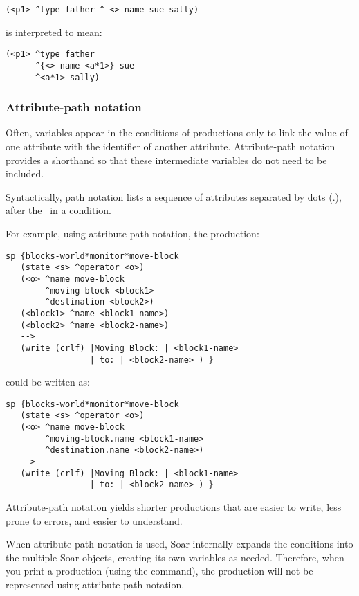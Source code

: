 \begin{verbatim}
(<p1> ^type father ^ <> name sue sally)
\end{verbatim}

is interpreted to mean:

\begin{verbatim}
(<p1> ^type father 
      ^{<> name <a*1>} sue 
      ^<a*1> sally)
\end{verbatim}


\subsubsection{Attribute-path notation}
\label{SYNTAX-pm-lhs-path}

Often, variables appear in the conditions of productions only to link the value of one attribute with the identifier of another attribute. Attribute-path notation provides a shorthand so that these intermediate variables do not need to be included.

Syntactically, path notation lists a sequence of attributes separated by dots (.), after the \carat \ in a condition.

For example, using attribute path notation, the production:

\begin{verbatim}
sp {blocks-world*monitor*move-block
   (state <s> ^operator <o>)
   (<o> ^name move-block
        ^moving-block <block1>
        ^destination <block2>)
   (<block1> ^name <block1-name>)
   (<block2> ^name <block2-name>)   
   -->
   (write (crlf) |Moving Block: | <block1-name>
                 | to: | <block2-name> ) }
\end{verbatim}

could be written as:

\begin{verbatim}
sp {blocks-world*monitor*move-block
   (state <s> ^operator <o>)
   (<o> ^name move-block
        ^moving-block.name <block1-name>
        ^destination.name <block2-name>)   
   -->
   (write (crlf) |Moving Block: | <block1-name>
                 | to: | <block2-name> ) }
\end{verbatim}

Attribute-path notation yields shorter productions that are easier to write, less prone to errors, and easier to understand.

When attribute-path notation is used, Soar internally expands the conditions into the multiple Soar objects, creating its own variables as needed. Therefore, when you print a production (using the  command), the production will not be represented using attribute-path notation.


